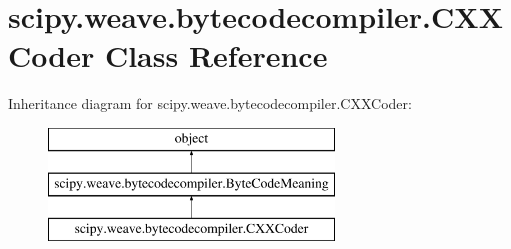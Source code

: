 \hypertarget{classscipy_1_1weave_1_1bytecodecompiler_1_1CXXCoder}{}\section{scipy.\+weave.\+bytecodecompiler.\+C\+X\+X\+Coder Class Reference}
\label{classscipy_1_1weave_1_1bytecodecompiler_1_1CXXCoder}
Inheritance diagram for scipy.\+weave.\+bytecodecompiler.\+C\+X\+X\+Coder\+:\begin{figure}[H]
\begin{center}
\leavevmode
\includegraphics[height=3.000000cm]{classscipy_1_1weave_1_1bytecodecompiler_1_1CXXCoder}
\end{center}
\end{figure}
